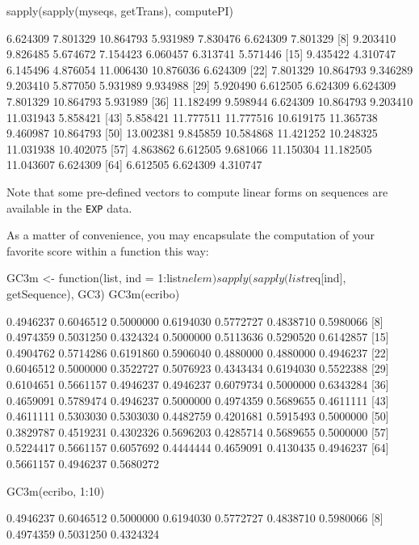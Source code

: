 \documentclass{article}
\begin{document}
\begin{Schunk}
\begin{Sinput}
 sapply(sapply(myseqs, getTrans), computePI)
\end{Sinput}
\begin{Soutput}
 [1]  6.624309  7.801329 10.864793  5.931989  7.830476  6.624309  7.801329
 [8]  9.203410  9.826485  5.674672  7.154423  6.060457  6.313741  5.571446
[15]  9.435422  4.310747  6.145496  4.876054 11.006430 10.876036  6.624309
[22]  7.801329 10.864793  9.346289  9.203410  5.877050  5.931989  9.934988
[29]  5.920490  6.612505  6.624309  6.624309  7.801329 10.864793  5.931989
[36] 11.182499  9.598944  6.624309 10.864793  9.203410 11.031943  5.858421
[43]  5.858421 11.777511 11.777516 10.619175 11.365738  9.460987 10.864793
[50] 13.002381  9.845859 10.584868 11.421252 10.248325 11.031938 10.402075
[57]  4.863862  6.612505  9.681066 11.150304 11.182505 11.043607  6.624309
[64]  6.612505  6.624309  4.310747
\end{Soutput}
\end{Schunk}

Note that some pre-defined vectors to compute linear forms on sequences are
available in the \texttt{EXP} data.

As a matter of convenience, you may encapsulate the computation of your favorite score 
within a function this way:

\begin{Schunk}
\begin{Sinput}
 GC3m <- function(list, ind = 1:list$nelem) sapply(sapply(list$req[ind], 
     getSequence), GC3)
 GC3m(ecribo)
\end{Sinput}
\begin{Soutput}
 [1] 0.4946237 0.6046512 0.5000000 0.6194030 0.5772727 0.4838710 0.5980066
 [8] 0.4974359 0.5031250 0.4324324 0.5000000 0.5113636 0.5290520 0.6142857
[15] 0.4904762 0.5714286 0.6191860 0.5906040 0.4880000 0.4880000 0.4946237
[22] 0.6046512 0.5000000 0.3522727 0.5076923 0.4343434 0.6194030 0.5522388
[29] 0.6104651 0.5661157 0.4946237 0.4946237 0.6079734 0.5000000 0.6343284
[36] 0.4659091 0.5789474 0.4946237 0.5000000 0.4974359 0.5689655 0.4611111
[43] 0.4611111 0.5303030 0.5303030 0.4482759 0.4201681 0.5915493 0.5000000
[50] 0.3829787 0.4519231 0.4302326 0.5696203 0.4285714 0.5689655 0.5000000
[57] 0.5224417 0.5661157 0.6057692 0.4444444 0.4659091 0.4130435 0.4946237
[64] 0.5661157 0.4946237 0.5680272
\end{Soutput}
\begin{Sinput}
 GC3m(ecribo, 1:10)
\end{Sinput}
\begin{Soutput}
 [1] 0.4946237 0.6046512 0.5000000 0.6194030 0.5772727 0.4838710 0.5980066
 [8] 0.4974359 0.5031250 0.4324324
\end{Soutput}
\end{Schunk}
\end{document}
